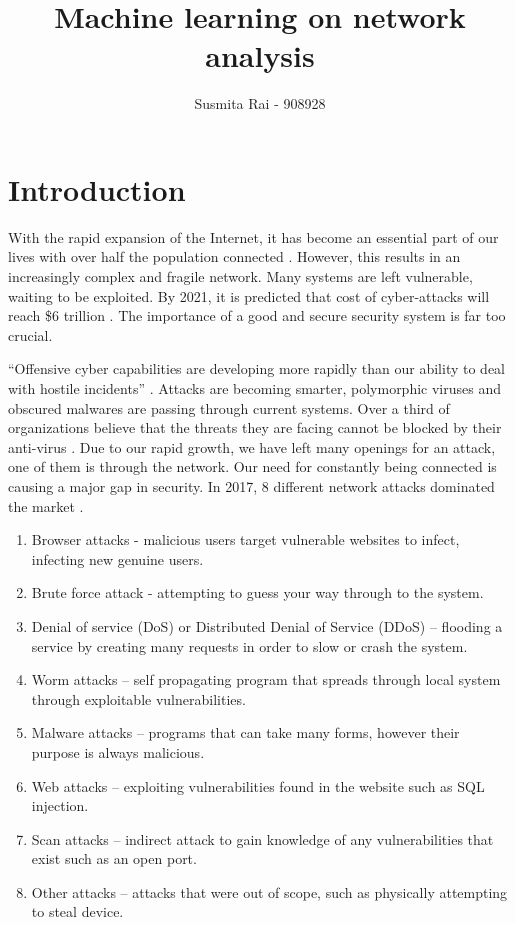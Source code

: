\documentclass[12pt]{article}
\begin{document}
\title{Machine learning on network analysis}
\author{Susmita Rai - 908928}
\date{}
\maketitle
\newpage

\tableofcontents
\newpage

\section{Introduction}
With the rapid expansion of the Internet, it has become an essential part of our lives with over half the population connected \cite{wearesocial}. However, this results in an increasingly complex and fragile network. Many systems are left vulnerable, waiting to be exploited. By 2021, it is predicted that cost of cyber-attacks will reach \$6 trillion \cite{varonis}. The importance of a good and secure security system is far too crucial.

“Offensive cyber capabilities are developing more rapidly than our ability to deal with hostile incidents” \cite{globalrisks}. Attacks are becoming smarter, polymorphic viruses and obscured malwares are passing through current systems. Over a third of organizations believe that the threats they are facing cannot be blocked by their anti-virus \cite{varonis}. 
Due to our rapid growth, we have left many openings for an attack, one of them is through the network. Our need for constantly being connected is causing a major gap in security. In 2017, 8 different network attacks dominated the market \cite{network-attack-types}.

\begin{enumerate}
  \item Browser attacks - malicious users target vulnerable websites to infect, infecting new genuine users. 
  \item Brute force attack - attempting to guess your way through to the system. 
  \item Denial of service (DoS) or Distributed Denial of Service (DDoS) – flooding a service by creating many requests in order to slow or crash the system.
  \item Worm attacks – self propagating program that spreads through local system through exploitable vulnerabilities.
  \item Malware attacks – programs that can take many forms, however their purpose is always malicious.
  \item Web attacks – exploiting vulnerabilities found in the website such as SQL injection.
  \item Scan attacks – indirect attack to gain knowledge of any vulnerabilities that exist such as an open port. 
  \item Other attacks – attacks that were out of scope, such as physically attempting to steal device.
\end{enumerate}
\end{document}
